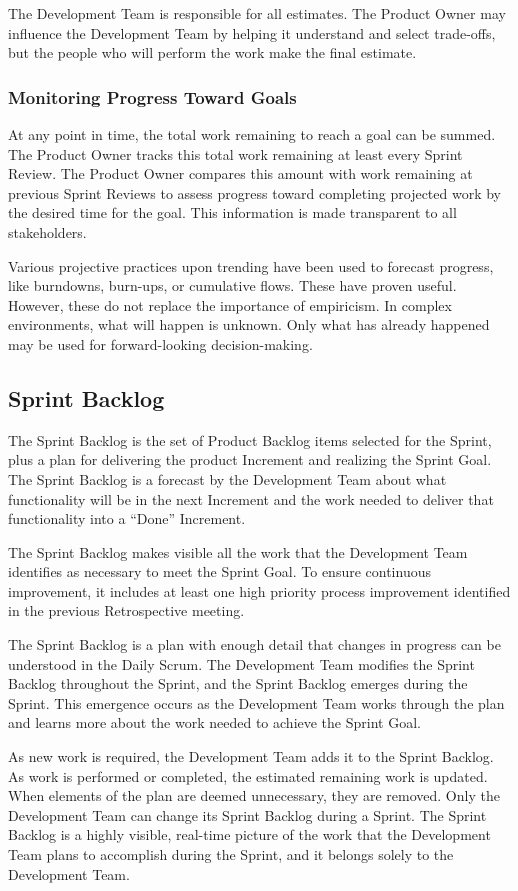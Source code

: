 The Development Team is responsible for all estimates. The Product Owner may influence the
Development Team by helping it understand and select trade-offs, but the people who will
perform the work make the final estimate.

\subsubsection{Monitoring Progress Toward Goals}
At any point in time, the total work remaining to reach a goal can be summed. The Product
Owner tracks this total work remaining at least every Sprint Review. The Product Owner
compares this amount with work remaining at previous Sprint Reviews to assess progress
toward completing projected work by the desired time for the goal. This information is made
transparent to all stakeholders.

Various projective practices upon trending have been used to forecast progress, like burndowns,
burn-ups, or cumulative flows. These have proven useful. However, these do not replace
the importance of empiricism. In complex environments, what will happen is unknown. Only
what has already happened may be used for forward-looking decision-making.

\subsection{Sprint Backlog}
The Sprint Backlog is the set of Product Backlog items selected for the Sprint, plus a plan for
delivering the product Increment and realizing the Sprint Goal. The Sprint Backlog is a forecast
by the Development Team about what functionality will be in the next Increment and the work
needed to deliver that functionality into a ``Done'' Increment.

The Sprint Backlog makes visible all the work that the Development Team identifies as necessary
to meet the Sprint Goal. To ensure continuous improvement, it includes at least one high
priority process improvement identified in the previous Retrospective meeting.

The Sprint Backlog is a plan with enough detail that changes in progress can be understood in
the Daily Scrum. The Development Team modifies the Sprint Backlog throughout the Sprint, and
the Sprint Backlog emerges during the Sprint. This emergence occurs as the Development Team
works through the plan and learns more about the work needed to achieve the Sprint Goal.

As new work is required, the Development Team adds it to the Sprint Backlog. As work is
performed or completed, the estimated remaining work is updated. When elements of the plan
are deemed unnecessary, they are removed. Only the Development Team can change its Sprint
Backlog during a Sprint. The Sprint Backlog is a highly visible, real-time picture of the work that
the Development Team plans to accomplish during the Sprint, and it belongs solely to the
Development Team.

